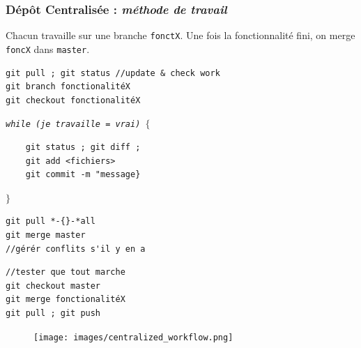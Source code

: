 \documentclass[table,tikz,12pt,svgnames]{beamer}
\begin{document}

\begin{frame}[fragile]
\frametitle{Dépôt Centralisée :\textit{ méthode de travail}}
\begin{adjustwidth}{-1em}{0cm}{}
\vspace{-2.3em}
\color{darkgreen}%
Chacun travaille sur une branche \texttt{fonctX}. Une fois la fonctionnalité fini, on merge \texttt{foncX} dans \texttt{master}.\\
\color{black}
\vspace{-1em}
\begin{verbatim}
git pull ; git status //update & check work
git branch fonctionalitéX
git checkout fonctionalitéX
\end{verbatim}

\textit{\texttt{while (je travaille = vrai) $\{$}}
\begin{verbatim}
	git status ; git diff ;
	git add <fichiers>
	git commit -m "message}
\end{verbatim}
\textit{\texttt{$\}$}}
\begin{verbatim}
git pull *-{}-*all
git merge master
//gérér conflits s'il y en a
\end{verbatim}
\begin{verbatim}
//tester que tout marche
git checkout master
git merge fonctionalitéX
git pull ; git push
\end{verbatim}
\end{adjustwidth}

\vspace{-12em}

\begin{adjustwidth}{-0cm}{-1cm}{}
	\begin{figure}
		\hfill
		\texttt{[image: images/centralized\_workflow.png]}
	\end{figure}
\end{adjustwidth}


\end{frame}
\end{document}
